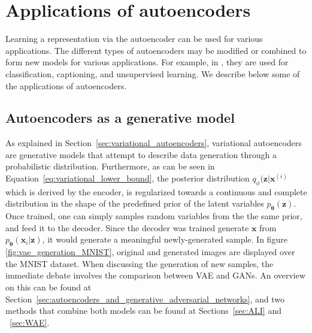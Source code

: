 \documentclass[graybox]{svmult}
\newcommand{\mb}[1]{\mathbf{#1}}
\newcommand{\bx}[0]{\mb{x}}
\newcommand{\bz}[0]{\mb{z}}
\newcommand{\btheta}[0]{\mb{\theta}}
\begin{document}
\section{Applications of autoencoders}
\label{sec:Applications_of_autoencoders}
Learning a representation via the autoencoder can be used for various applications. The different types of autoencoders may be modified or combined to form new models for various applications. For example, in \cite{VariationalAutoEncoderClassification}, they are used  for classification, captioning, and unsupervised learning.
We describe below some of the applications of autoencoders. 



\subsection{Autoencoders as a generative model}

As explained in Section~\ref{sec:variational_autoencoders}, variational autoencoders are generative models that attempt to describe data generation through a probabilistic distribution. Furthermore, as can be seen in Equation~\ref{eq:variational_lower_bound}, the posterior distribution $q_\phi(\bz|\bx^{(i)}$ which is derived by the encoder, is regularized towards a continuous and complete distribution in the shape of the predefined prior of the latent variables $p_\btheta(\bz)$. Once trained, one can simply samples random variables from the the same prior, and feed it to the decoder. Since the decoder was trained generate $\bx$ from $p_\btheta(\bx_i|\bz)$, it would generate a meaningful newly-generated sample. In figure \ref{fig:vae_generation_MNIST}, original and generated images are displayed over the MNIST dataset.
When discussing the generation of new samples, the immediate debate involves the comparison between VAE and GANs. An overview on this can be found at Section~\ref{sec:autoencoders_and_generative_adversarial_networks}, and two methods that combine both models can be found at Sections~\ref{sec:ALI} and ~\ref{sec:WAE}.
\end{document}
